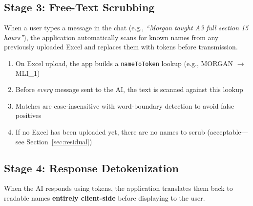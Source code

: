 \documentclass[11pt,letterpaper]{article}
\begin{document}
\subsection{Stage 3: Free-Text Scrubbing}

When a user types a message in the chat (e.g., \textit{``Morgan taught A3 full section 15 hours''}), the application automatically scans for known names from any previously uploaded Excel and replaces them with tokens before transmission.

\begin{center}
\end{center}

\begin{tcolorbox}[infostyle, title={How Free-Text Scrubbing Works}]
\begin{enumerate}[nosep,leftmargin=*]
  \item On Excel upload, the app builds a \texttt{nameToToken} lookup (e.g., MORGAN $\rightarrow$ MLI\_1)
  \item Before \textit{every} message sent to the AI, the text is scanned against this lookup
  \item Matches are case-insensitive with word-boundary detection to avoid false positives
  \item If no Excel has been uploaded yet, there are no names to scrub (acceptable---see Section~\ref{sec:residual})
\end{enumerate}
\end{tcolorbox}

\subsection{Stage 4: Response Detokenization}

When the AI responds using tokens, the application translates them back to readable names \textbf{entirely client-side} before displaying to the user.
\end{document}

